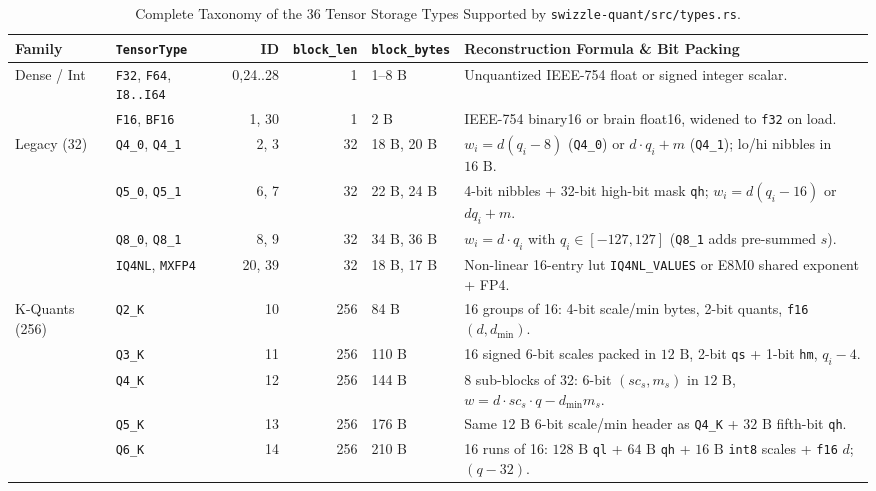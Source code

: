 \documentclass[10pt,a4paper]{article}
\theoremstyle{swzstyle}
\newcommand{\code}[1]{\texttt{#1}}
\begin{document}
\begin{table}[htbp]
  \centering
  \caption{Complete Taxonomy of the 36 Tensor Storage Types Supported by \texttt{swizzle-quant/src/types.rs}.}
  \label{tab:tensor_types}
  \footnotesize
  \begin{tabularx}{\textwidth}{@{}llrrlX@{}}
    \toprule
    \sffamily\bfseries Family & \sffamily\bfseries \texttt{TensorType} & \sffamily\bfseries ID & \sffamily\bfseries \texttt{block\_len} & \sffamily\bfseries \texttt{block\_bytes} & \sffamily\bfseries Reconstruction Formula \& Bit Packing \\
    \midrule
    \multirow{2}{*}{Dense / Int} & \code{F32}, \code{F64}, \code{I8..I64} & 0,24..28 & 1 & 1--8 B & Unquantized IEEE-754 float or signed integer scalar. \\
    & \code{F16}, \code{BF16} & 1, 30 & 1 & 2 B & IEEE-754 binary16 or brain float16, widened to \code{f32} on load. \\
    \midrule
    \multirow{4}{*}{Legacy (32)} & \code{Q4\_0}, \code{Q4\_1} & 2, 3 & 32 & 18 B, 20 B & $w_i = d(q_i - 8)$ (\code{Q4\_0}) or $d\cdot q_i + m$ (\code{Q4\_1}); lo/hi nibbles in $16\text{ B}$. \\
    & \code{Q5\_0}, \code{Q5\_1} & 6, 7 & 32 & 22 B, 24 B & 4-bit nibbles + 32-bit high-bit mask \code{qh}; $w_i = d(q_i - 16)$ or $d q_i + m$. \\
    & \code{Q8\_0}, \code{Q8\_1} & 8, 9 & 32 & 34 B, 36 B & $w_i = d \cdot q_i$ with $q_i \in [-127, 127]$ (\code{Q8\_1} adds pre-summed $s$). \\
    & \code{IQ4NL}, \code{MXFP4} & 20, 39 & 32 & 18 B, 17 B & Non-linear 16-entry lut \code{IQ4NL\_VALUES} or E8M0 shared exponent + FP4. \\
    \midrule
    \multirow{6}{*}{K-Quants (256)} & \code{Q2\_K} & 10 & 256 & 84 B & 16 groups of 16: 4-bit scale/min bytes, 2-bit quants, \code{f16} $(d, d_{\min})$. \\
    & \code{Q3\_K} & 11 & 256 & 110 B & 16 signed 6-bit scales packed in $12\text{ B}$, 2-bit \code{qs} + 1-bit \code{hm}, $q_i - 4$. \\
    & \code{Q4\_K} & 12 & 256 & 144 B & 8 sub-blocks of 32: 6-bit $(sc_s, m_s)$ in $12\text{ B}$, $w = d\cdot sc_s \cdot q - d_{\min} m_s$. \\
    & \code{Q5\_K} & 13 & 256 & 176 B & Same $12\text{ B}$ 6-bit scale/min header as \code{Q4\_K} + $32\text{ B}$ fifth-bit \code{qh}. \\
    & \code{Q6\_K} & 14 & 256 & 210 B & 16 runs of 16: $128\text{ B}$ \code{ql} + $64\text{ B}$ \code{qh} + $16\text{ B}$ \code{int8} scales + \code{f16} $d$; $(q - 32)$. \\

\end{tabularx}
\end{table}
\end{document}
